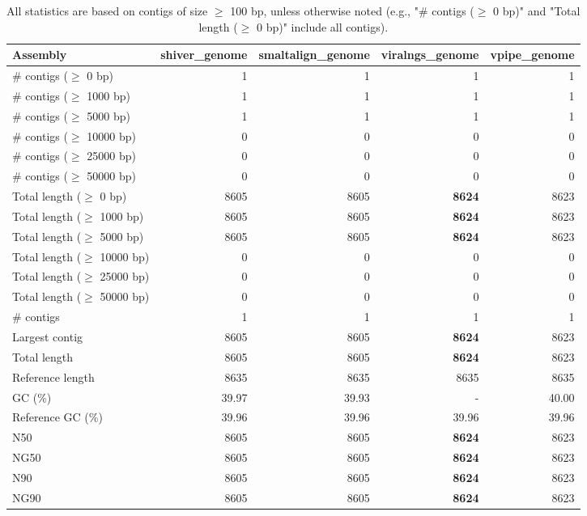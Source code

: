 \documentclass[12pt,a4paper]{article}
\begin{document}
\begin{table}[ht]
\begin{center}
\caption{All statistics are based on contigs of size $\geq$ 100 bp, unless otherwise noted (e.g., "\# contigs ($\geq$ 0 bp)" and "Total length ($\geq$ 0 bp)" include all contigs).}
\begin{tabular}{|l*{4}{|r}|}
\hline
Assembly & shiver\_genome & smaltalign\_genome & viralngs\_genome & vpipe\_genome \\ \hline
\# contigs ($\geq$ 0 bp) & 1 & 1 & 1 & 1 \\ \hline
\# contigs ($\geq$ 1000 bp) & 1 & 1 & 1 & 1 \\ \hline
\# contigs ($\geq$ 5000 bp) & 1 & 1 & 1 & 1 \\ \hline
\# contigs ($\geq$ 10000 bp) & 0 & 0 & 0 & 0 \\ \hline
\# contigs ($\geq$ 25000 bp) & 0 & 0 & 0 & 0 \\ \hline
\# contigs ($\geq$ 50000 bp) & 0 & 0 & 0 & 0 \\ \hline
Total length ($\geq$ 0 bp) & 8605 & 8605 & {\bf 8624} & 8623 \\ \hline
Total length ($\geq$ 1000 bp) & 8605 & 8605 & {\bf 8624} & 8623 \\ \hline
Total length ($\geq$ 5000 bp) & 8605 & 8605 & {\bf 8624} & 8623 \\ \hline
Total length ($\geq$ 10000 bp) & 0 & 0 & 0 & 0 \\ \hline
Total length ($\geq$ 25000 bp) & 0 & 0 & 0 & 0 \\ \hline
Total length ($\geq$ 50000 bp) & 0 & 0 & 0 & 0 \\ \hline
\# contigs & 1 & 1 & 1 & 1 \\ \hline
Largest contig & 8605 & 8605 & {\bf 8624} & 8623 \\ \hline
Total length & 8605 & 8605 & {\bf 8624} & 8623 \\ \hline
Reference length & 8635 & 8635 & 8635 & 8635 \\ \hline
GC (\%) & 39.97 & 39.93 & - & 40.00 \\ \hline
Reference GC (\%) & 39.96 & 39.96 & 39.96 & 39.96 \\ \hline
N50 & 8605 & 8605 & {\bf 8624} & 8623 \\ \hline
NG50 & 8605 & 8605 & {\bf 8624} & 8623 \\ \hline
N90 & 8605 & 8605 & {\bf 8624} & 8623 \\ \hline
NG90 & 8605 & 8605 & {\bf 8624} & 8623 \\ \hline

\end{tabular}
\end{center}
\end{table}
\end{document}
